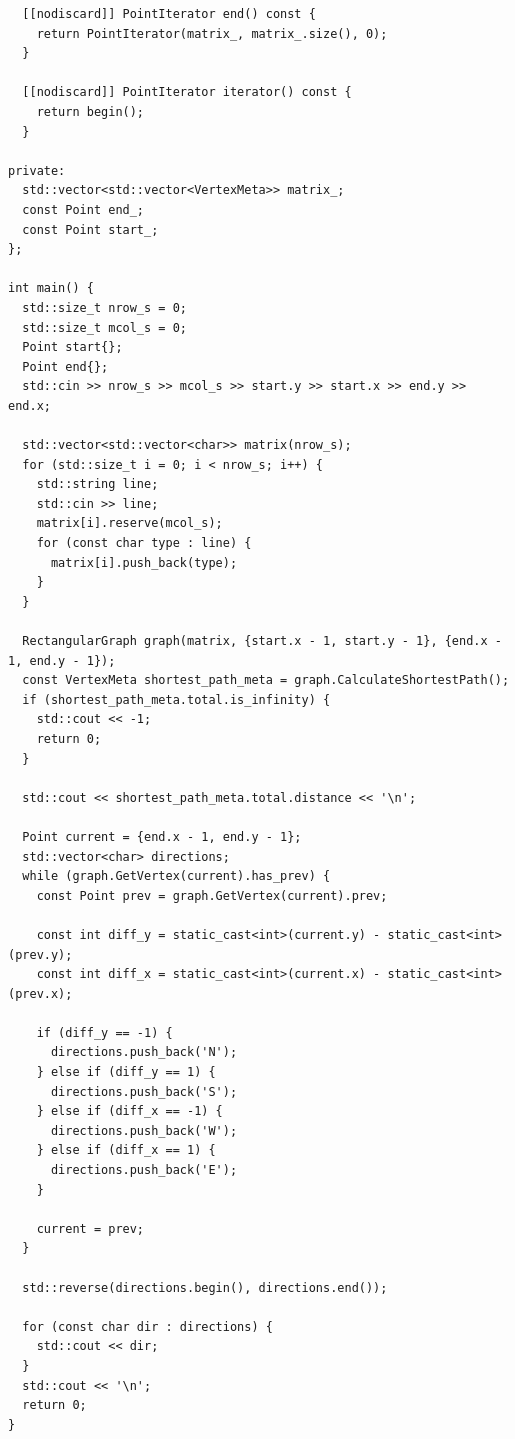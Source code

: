 \begin{lstlisting}
  [[nodiscard]] PointIterator end() const {
    return PointIterator(matrix_, matrix_.size(), 0);
  }

  [[nodiscard]] PointIterator iterator() const {
    return begin();
  }

private:
  std::vector<std::vector<VertexMeta>> matrix_;
  const Point end_;
  const Point start_;
};

int main() {
  std::size_t nrow_s = 0;
  std::size_t mcol_s = 0;
  Point start{};
  Point end{};
  std::cin >> nrow_s >> mcol_s >> start.y >> start.x >> end.y >> end.x;

  std::vector<std::vector<char>> matrix(nrow_s);
  for (std::size_t i = 0; i < nrow_s; i++) {
    std::string line;
    std::cin >> line;
    matrix[i].reserve(mcol_s);
    for (const char type : line) {
      matrix[i].push_back(type);
    }
  }

  RectangularGraph graph(matrix, {start.x - 1, start.y - 1}, {end.x - 1, end.y - 1});
  const VertexMeta shortest_path_meta = graph.CalculateShortestPath();
  if (shortest_path_meta.total.is_infinity) {
    std::cout << -1;
    return 0;
  }

  std::cout << shortest_path_meta.total.distance << '\n';

  Point current = {end.x - 1, end.y - 1};
  std::vector<char> directions;
  while (graph.GetVertex(current).has_prev) {
    const Point prev = graph.GetVertex(current).prev;

    const int diff_y = static_cast<int>(current.y) - static_cast<int>(prev.y);
    const int diff_x = static_cast<int>(current.x) - static_cast<int>(prev.x);

    if (diff_y == -1) {
      directions.push_back('N');
    } else if (diff_y == 1) {
      directions.push_back('S');
    } else if (diff_x == -1) {
      directions.push_back('W');
    } else if (diff_x == 1) {
      directions.push_back('E');
    }

    current = prev;
  }

  std::reverse(directions.begin(), directions.end());

  for (const char dir : directions) {
    std::cout << dir;
  }
  std::cout << '\n';
  return 0;
}
\end{lstlisting}